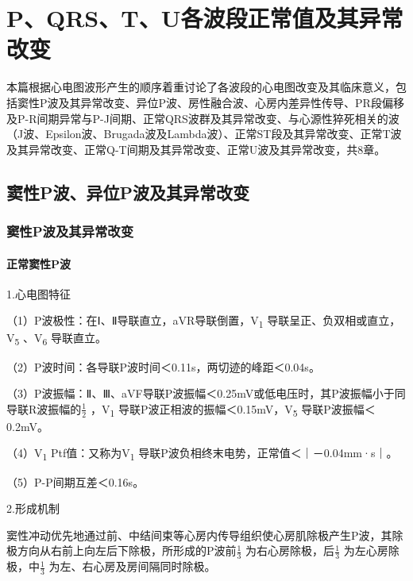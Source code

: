 \part{P、QRS、T、U各波段正常值及其异常改变}

本篇根据心电图波形产生的顺序着重讨论了各波段的心电图改变及其临床意义，包括窦性P波及其异常改变、异位P波、房性融合波、心房内差异性传导、PR段偏移及P-R间期异常与P-J间期、正常QRS波群及其异常改变、与心源性猝死相关的波（J波、Epsilon波、Brugada波及Lambda波）、正常ST段及其异常改变、正常T波及其异常改变、正常Q-T间期及其异常改变、正常U波及其异常改变，共8章。

\protect\hypertarget{text00007.html}{}{}

\protect\hypertarget{text00007.htmlux5cux23chapter7}{}{}

\chapter{窦性P波、异位P波及其异常改变}

\protect\hypertarget{text00007.htmlux5cux23subid1}{}{}

\section{窦性P波及其异常改变}

\protect\hypertarget{text00007.htmlux5cux23subid2}{}{}

\subsection{正常窦性P波}

1.心电图特征

（1）P波极性：在Ⅰ、Ⅱ导联直立，aVR导联倒置，V\textsubscript{1}
导联呈正、负双相或直立，V\textsubscript{5} 、V\textsubscript{6}
导联直立。

（2）P波时间：各导联P波时间＜0.11s，两切迹的峰距＜0.04s。

（3）P波振幅：Ⅱ、Ⅲ、aVF导联P波振幅＜0.25mV或低电压时，其P波振幅小于同导联R波振幅的$\frac{1}{2}$
，V\textsubscript{1} 导联P波正相波的振幅＜0.15mV，V\textsubscript{5}
导联P波振幅＜0.2mV。

（4）V\textsubscript{1} Ptf值：又称为V\textsubscript{1}
导联P波负相终末电势，正常值＜｜－0.04mm·s｜。

（5）P-P间期互差＜0.16s。

2.形成机制

窦性冲动优先地通过前、中结间束等心房内传导组织使心房肌除极产生P波，其除极方向从右前上向左后下除极，所形成的P波前$\frac{1}{3}$
为右心房除极，后$\frac{1}{3}$
为左心房除极，中$\frac{1}{3}$
为左、右心房及房间隔同时除极。

